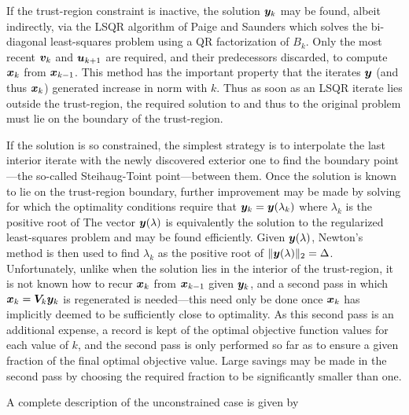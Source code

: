 \documentclass{galahad}
\begin{document}
If the trust-region constraint is inactive, the solution ${\bm{y}}_k$
may be found, albeit indirectly, via the LSQR algorithm of Paige and Saunders
which solves the bi-diagonal least-squares problem
using a QR factorization of $B_k$. Only the most recent ${\bm{v}}_k$ and ${\bm{u}}_{k+1}$
are required, and their predecessors discarded, to compute ${\bm{x}}_k$ from
${\bm{x}}_{k-1}$. This method has the important property that the iterates
${\bm{y}}$ (and thus ${\bm{x}}_k$) generated increase in norm with $k$. Thus
as soon as an LSQR iterate lies outside the trust-region, the required solution
to  and thus to the original problem must lie on the boundary of the
trust-region.

If the solution is so constrained, the simplest strategy is to interpolate
the last interior iterate with the newly discovered exterior one to find the
boundary point---the so-called Steihaug-Toint point---between them.
Once the solution is known to lie on the trust-region boundary,
further improvement may be made by solving
for which the optimality conditions require that ${\bm{y}}_k = {\bm{y}}(\lambda_k)$
where $\lambda_k$ is the positive root of
The vector ${\bm{y}}(\lambda)$ is equivalently the solution to the
regularized least-squares problem
and may be found efficiently. Given  ${\bm{y}}(\lambda)$, Newton's method
is then used to find $\lambda_k$ as the positive root of
$\|{\bm{y}}(\lambda)\|_2 = \Delta$. Unfortunately, unlike when the solution
lies in the interior of the trust-region, it is not known how to recur
${\bm{x}}_k$ from ${\bm{x}}_{k-1}$ given ${\bm{y}}_k$, and a second pass in which
${\bm{x}}_k = {\bm{V}}_k {\bm{y}}_k$ is regenerated is needed---this need only be done
once ${\bm{x}}_k$ has implicitly deemed to be sufficiently close to optimality.
As this second pass is an additional expense, a record is kept of the
optimal objective function values for each value of $k$, and the second
pass is only performed so far as to ensure a given fraction of the
final optimal objective value. Large savings may be made in the second
pass by choosing the required fraction to be significantly smaller than one.

\galreferences
A complete description of the unconstrained case is given by
\vspace*{1mm}
\end{document}
